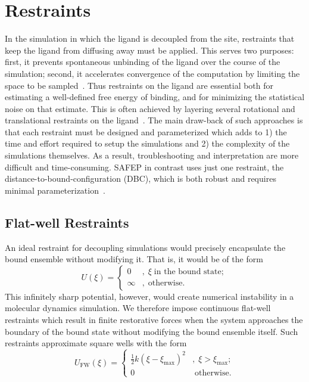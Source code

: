 \documentclass[9pt,tutorial,pubversion]{Styling/livecoms}
\begin{document}
\section{Restraints}\label{app:restraints}
In the simulation in which the ligand is decoupled from the site, restraints that keep the ligand from diffusing away must be applied. This serves two purposes: first, it prevents spontaneous unbinding of the ligand over the course of the simulation; second, it accelerates convergence of the computation by limiting the space to be sampled~\cite{Hermans1986}.
Thus restraints on the ligand are essential both for estimating a well-defined free energy of binding, and for minimizing the statistical noise on that estimate.
This is often achieved by layering several rotational and translational restraints on the ligand~\cite{Hermans1997, Gilson1997, Boresch2003, Hamelberg2004, Woo2005, Deng2006}.
The main draw-back of such approaches is that each restraint must be designed and parameterized which adds to 1) the time and effort required to setup the simulations and 2) the complexity of the simulations themselves. 
As a result, troubleshooting and interpretation are more difficult and time-consuming. 
SAFEP in contrast uses just one restraint, the distance-to-bound-configuration (DBC), which is both robust and requires minimal parameterization~\cite{Salari2018}.

\subsection{Flat-well Restraints}

An ideal restraint for decoupling simulations would precisely encapsulate the bound ensemble without modifying it. That is, it would be of the form
\begin{equation} \label{eq:squareWell}
    U(\xi) = \begin{cases}
        0 &, \; \xi\; \text{in the bound state};\\
        \infty &, \; \text{otherwise}.
    \end{cases}
\end{equation}
\noindent This infinitely sharp potential, however, would create numerical instability in a molecular dynamics simulation. We therefore impose continuous flat-well restraints which result in finite restorative forces when the system approaches the boundary of the bound state without modifying the bound ensemble itself. Such restraints approximate square wells with the form
\begin{equation} \label{eq:harmonicWall}
    U_\mathrm{FW}(\xi) = \begin{cases}
        \frac{1}{2}k \left(\xi-\xi_\mathrm{max}\right)^2 &, \; \xi > \xi_\mathrm{max};\\
        0                                                & \; \text{otherwise}.
    \end{cases}
\end{equation}
\end{document}
